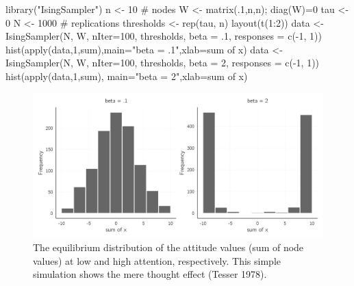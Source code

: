 \documentclass[
  a4paper,
  DIV=11,
  numbers=noendperiod,
  oneside]{scrreprt}
\newenvironment{Shaded}{\begin{snugshade}}{\end{snugshade}}
\newcommand{\AttributeTok}[1]{\textcolor[rgb]{0.40,0.45,0.13}{#1}}
\newcommand{\CommentTok}[1]{\textcolor[rgb]{0.37,0.37,0.37}{#1}}
\newcommand{\DecValTok}[1]{\textcolor[rgb]{0.68,0.00,0.00}{#1}}
\newcommand{\FunctionTok}[1]{\textcolor[rgb]{0.28,0.35,0.67}{#1}}
\newcommand{\NormalTok}[1]{\textcolor[rgb]{0.00,0.23,0.31}{#1}}
\newcommand{\OtherTok}[1]{\textcolor[rgb]{0.00,0.23,0.31}{#1}}
\newcommand{\SpecialCharTok}[1]{\textcolor[rgb]{0.37,0.37,0.37}{#1}}
\newcommand{\StringTok}[1]{\textcolor[rgb]{0.13,0.47,0.30}{#1}}
\begin{document}
\begin{Shaded}
\begin{Highlighting}[]
\FunctionTok{library}\NormalTok{(}\StringTok{"IsingSampler"}\NormalTok{)}
\NormalTok{n }\OtherTok{\textless{}{-}} \DecValTok{10} \CommentTok{\# nodes}
\NormalTok{W }\OtherTok{\textless{}{-}} \FunctionTok{matrix}\NormalTok{(.}\DecValTok{1}\NormalTok{,n,n); }\FunctionTok{diag}\NormalTok{(W)}\OtherTok{=}\DecValTok{0}
\NormalTok{tau }\OtherTok{\textless{}{-}} \DecValTok{0}
\NormalTok{N }\OtherTok{\textless{}{-}} \DecValTok{1000} \CommentTok{\# replications}
\NormalTok{thresholds }\OtherTok{\textless{}{-}} \FunctionTok{rep}\NormalTok{(tau, n)}
\FunctionTok{layout}\NormalTok{(}\FunctionTok{t}\NormalTok{(}\DecValTok{1}\SpecialCharTok{:}\DecValTok{2}\NormalTok{))}
\NormalTok{data }\OtherTok{\textless{}{-}} \FunctionTok{IsingSampler}\NormalTok{(N, W, }\AttributeTok{nIter=}\DecValTok{100}\NormalTok{, thresholds, }\AttributeTok{beta =}\NormalTok{ .}\DecValTok{1}\NormalTok{, }\AttributeTok{responses =} \FunctionTok{c}\NormalTok{(}\SpecialCharTok{{-}}\DecValTok{1}\NormalTok{, }\DecValTok{1}\NormalTok{))}
\FunctionTok{hist}\NormalTok{(}\FunctionTok{apply}\NormalTok{(data,}\DecValTok{1}\NormalTok{,sum),}\AttributeTok{main=}\StringTok{"beta = .1"}\NormalTok{,}\AttributeTok{xlab=}\StringTok{\textquotesingle{}sum of x\textquotesingle{}}\NormalTok{)}
\NormalTok{data }\OtherTok{\textless{}{-}} \FunctionTok{IsingSampler}\NormalTok{(N, W, }\AttributeTok{nIter=}\DecValTok{100}\NormalTok{, thresholds, }\AttributeTok{beta =} \DecValTok{2}\NormalTok{, }\AttributeTok{responses =} \FunctionTok{c}\NormalTok{(}\SpecialCharTok{{-}}\DecValTok{1}\NormalTok{, }\DecValTok{1}\NormalTok{))}
\FunctionTok{hist}\NormalTok{(}\FunctionTok{apply}\NormalTok{(data,}\DecValTok{1}\NormalTok{,sum), }\AttributeTok{main=}\StringTok{"beta = 2"}\NormalTok{,}\AttributeTok{xlab=}\StringTok{\textquotesingle{}sum of x\textquotesingle{}}\NormalTok{)}
\end{Highlighting}
\end{Shaded}

\begin{figure}

{\centering \includegraphics{media/ch6/fig-ch6-img12-old-81.jpg}

}

\caption{\label{fig-ch6-img12-old-81}The equilibrium distribution of the
attitude values (sum of node values) at low and high attention,
respectively. This simple simulation shows the mere thought effect
(Tesser 1978).}

\end{figure}
\end{document}
